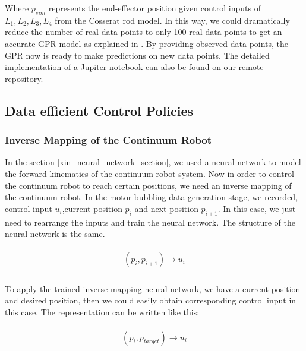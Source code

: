 Where $p_{sim}$ represents the end-effector position given control inputs of $L_1,L_2,L_3,L_4$ from the Cosserat rod model. In this way, we could dramatically reduce the number of real data points to only 100 real data points to get an accurate GPR model as explained in \cite{wang2022data}. By providing observed data points, the GPR now is ready to make predictions on new data points. The detailed implementation of a Jupiter notebook can also be found on our remote repository. 

\subsection{Data efficient Control Policies}

\subsubsection{Inverse Mapping of the Continuum Robot}

In the section \ref{xin_neural_network_section}, we used a neural network to model the forward kinematics of the continuum robot system. Now in order to control the continuum robot to reach certain positions, we need an inverse mapping of the continuum robot. In the motor bubbling data generation stage, we recorded, control input $u_i$,current position $p_i$ and next position $p_{i+1}$. In this case, we just need to rearrange the inputs and train the neural network. The structure of the neural network is the same. 

\begin{align}
    \begin{split}
        (p_i, p_{i+1})\rightarrow u_i\\
    \end{split}
    \label{eq:X13}
\end{align}

To apply the trained inverse mapping neural network, we have a current position and desired position, then we could easily obtain corresponding control input in this case. The representation can be written like this:

\begin{align}
    \begin{split}
        (p_i, p_{target})\rightarrow u_i\\
    \end{split}
    \label{eq:X14}
\end{align}



